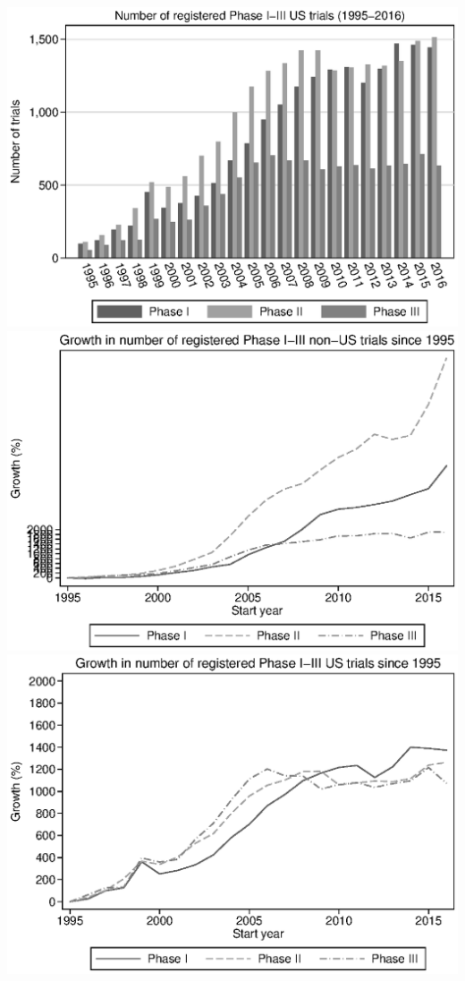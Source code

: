 \includegraphics{../figures/A01a-trial_count_by_phase_us.eps}
\includegraphics{../figures/A01b-trial_growth_by_phase_non-us.eps}
\includegraphics{../figures/A01b-trial_growth_by_phase_us.eps}
